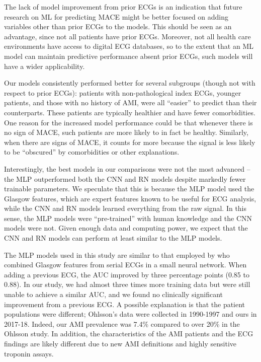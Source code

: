\documentclass[preprint]{elsarticle}
\begin{document}
The lack of model improvement from prior ECGs is an indication that future research on ML for predicting MACE might be better focused on adding variables other than prior ECGs to the models. This should be seen as an advantage, since not all patients have prior ECGs. Moreover, not all health care environments have access to digital ECG databases, so to the extent that an ML model can maintain predictive performance absent prior ECGs, such models will have a wider applicability.

Our models consistently performed better for several subgroups (though not with respect to prior ECGs): patients with non-pathological index ECGs, younger patients, and those with no history of AMI, were all ``easier'' to predict than their counterparts. These patients are typically healthier and have fewer comorbidities. One reason for the increased model performance could be that whenever there is no sign of MACE, such patients are more likely to in fact be healthy. Similarly, when there are signs of MACE, it counts for more because the signal is less likely to be ``obscured'' by comorbidities or other explanations.

Interestingly, the best models in our comparisons were not the most advanced – the MLP outperformed both the CNN and RN models despite markedly fewer trainable parameters. We speculate that this is because the MLP model used the Glasgow features, which are expert features known to be useful for ECG analysis, while the CNN and RN models learned everything from the raw signal. In this sense, the MLP models were ``pre-trained'' with human knowledge and the CNN models were not. Given enough data and computing power, we expect that the CNN and RN models can perform at least similar to the MLP models.

The MLP models used in this study are similar to that employed by \citet{ohlsson2001} who combined Glasgow features from serial ECGs in a small neural network. When adding a previous ECG, the AUC improved by three percentage points (0.85 to 0.88). In our study, we had almost three times more training data but were still unable to achieve a similar AUC, and we found no clinically significant improvement from a previous ECG. A possible explanation is that the patient populations were different; Ohlsson's data were collected in 1990-1997 and ours in 2017-18. Indeed, our AMI prevalence was 7.4\% compared to over 20\% in the Ohlsson study. In addition, the characteristics of the AMI patients and the ECG findings are likely different due to new AMI definitions and highly sensitive troponin assays. 
\end{document}
